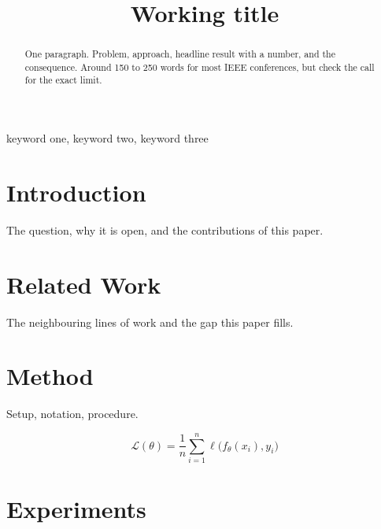 \documentclass[conference]{IEEEtran}
\begin{document}
\title{Working title}

\author{
}

\maketitle

\begin{abstract}
One paragraph. Problem, approach, headline result with a number, and the
consequence. Around 150 to 250 words for most IEEE conferences, but check the
call for the exact limit.
\end{abstract}

\begin{IEEEkeywords}
keyword one, keyword two, keyword three
\end{IEEEkeywords}

\section{Introduction}
\label{sec:introduction}

The question, why it is open, and the contributions of this paper.

\section{Related Work}
\label{sec:related}

The neighbouring lines of work and the gap this paper fills.

\section{Method}
\label{sec:method}

Setup, notation, procedure.

\begin{equation}
\label{eq:objective}
\mathcal{L}(\theta) = \frac{1}{n} \sum_{i=1}^{n} \ell\bigl(f_\theta(x_i), y_i\bigr)
\end{equation}

\section{Experiments}
\label{sec:experiments}
\end{document}
